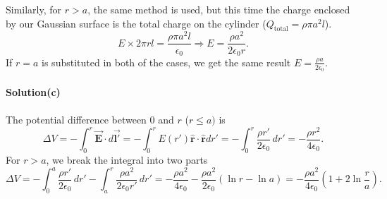 \documentclass{article}
\begin{document}
Similarly, for $r>a$, the same method is used, but this time the charge enclosed by our Gaussian surface is the total charge on the cylinder ($Q_{\text{total}}=\rho\pi a^2l$).
\[E\times2\pi rl=\frac{\rho\pi a^2l}{\epsilon_0}\Rightarrow E=\frac{\rho a^2}{2\epsilon_0r}.\]
If $r=a$ is substituted in both of the cases, we get the same result $E=\frac{\rho a}{2\epsilon_0}$.
\\
\\\textbf{Solution(c)}
\\
\\The potential difference between 0 and $r$ ($r\leq a)$ is
\[\Delta V=-\int_{0}^{r}\Vec{\boldsymbol{E}}\cdot d\Vec{\boldsymbol{l'}}=-\int_{0}^{r}E(r')\boldsymbol{\hat{r}}\cdot \boldsymbol{\hat{r}}dr'=-\int_{0}^{r}\frac{\rho r'}{2\epsilon_0}\,dr'=-\frac{\rho r^2}{4\epsilon_0}.\]
For $r>a$, we break the integral into two parts
\[\Delta V=-\int_{0}^{a}\frac{\rho r'}{2\epsilon_0}\,dr'-\int_{a}^{r}\frac{\rho a^2}{2\epsilon_0r'}\,dr'=-\frac{\rho a^2}{4\epsilon_0}-\frac{\rho a^2}{2\epsilon_0}(\ln r-\ln a)=-\frac{\rho a^2}{4\epsilon_0}\left(1+2\ln\frac{r}{a}\right).\]
\end{document}
